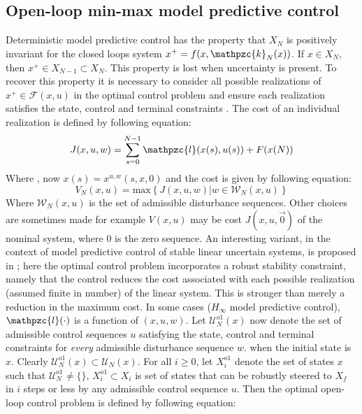 \subsection*{Open-loop min-max model predictive control}
\noindent Deterministic model predictive control has the property that $X_N$ is positively invariant for the closed loops system $x^+=f(x,\mathpzc{k}_N(x))$. If $x\in X_N$, then $x^+ \in X_{N-1}\subset X_N$. This property is lost when uncertainty is present. To recover this property it is necessary to consider all possible realizations of $x^+ \in \mathscr{F}(x,u)$ in the optimal control problem and ensure each realization satisfies the state, control and terminal constraints \cite{michalska1993robust,chen1997game,de1999robustness}. The cost of an individual realization is defined by following equation:
\begin{equation}
    J(x,u,w) = \sum_{s=0}^{N-1} \mathpzc{l}(x(s),u(s)) + F(x(N))
\end{equation}
\noindent Where , now $x(s)=x^{u,w}(s,x,0)$ and the cost is given by following equation:
\begin{equation}
    V_N(x,u)= \text{max}\left\{J(x,u,w)|w \in \mathscr{W}_N(x,u)\right\}
\end{equation}
\noindent Where $\mathscr{W}_N(x,u)$ is the set of admissible disturbance sequences. Other choices are sometimes made for example $V(x,u)$ may be cost $J(x,u,\vec{0})$ of the nominal system, where $0$ is the zero sequence. An interesting variant, in the context of model predictive control of stable linear uncertain systems, is proposed in \cite{badgwell1997robust}; here the optimal control problem incorporates a robust stability constraint, namely that the control reduces the cost associated with each possible realization (assumed finite in number) of the linear system. This is stronger than merely a reduction in the maximum cost. In some cases ($H_\infty$ model predictive control), $\mathpzc{l}(\cdot)$ is a function of $(x,u,w)$. Let $\mathscr{U}_N^{o1}(x)$ now denote the set of admissible control sequences $u$ satisfying the state, control and terminal constraints for \textit{every} admissible  disturbance sequence $w$. when the initial state is $x$. Clearly $\mathscr{U}_N^{o1}(x)\subset\mathscr{U}_N(x)$. For all $i\ge 0$, let $X_i^{o1}$ denote the set of states $x$ such that $\mathscr{U}_N^{o1}\neq\{\}$, $X_i^{o1}\subset X_i$ is set of states that can be robustly steered to $X_f$ in $i$ steps or less by any admissible control sequence $u$. Then the optimal open-loop control problem is defined by following equation:
